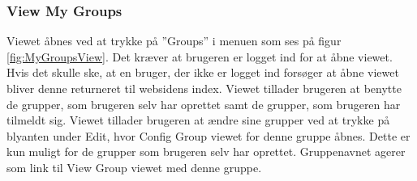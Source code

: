 \subsubsection{View My Groups}
Viewet åbnes ved at trykke på ''Groups'' i menuen som ses på figur \ref{fig:MyGroupsView}. Det kræver at brugeren er logget ind for at åbne viewet. Hvis det skulle ske, at en bruger, der ikke er logget ind forsøger at åbne viewet bliver denne returneret til websidens index.
Viewet tillader brugeren at benytte de grupper, som brugeren selv har oprettet samt de grupper, som brugeren har tilmeldt sig. Viewet tillader brugeren at ændre sine grupper ved at trykke på blyanten under Edit, hvor Config Group viewet for denne gruppe åbnes. Dette er kun muligt for de grupper som brugeren selv har oprettet. Gruppenavnet agerer som link til View Group viewet med denne gruppe. 


